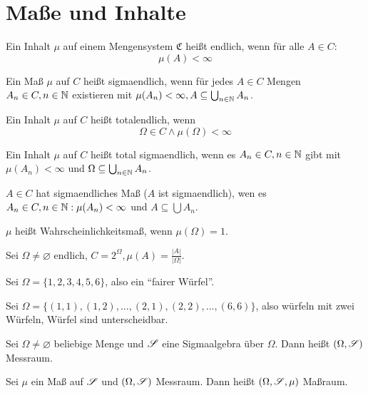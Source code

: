 	\section{Maße und Inhalte}
		\begin{defi}
			Ein Inhalt $\mu$ auf einem Mengensystem $\mathfrak{C}$ heißt endlich, wenn für alle $A\in C$:
			\[ \mu(A)<\infty \]
		\end{defi}
		\begin{defi}
			Ein Maß $\mu$ auf $C$ heißt sigmaendlich, wenn für jedes $A\in C$ Mengen $A_n\in C, n\in \mathbb{N}$ existieren mit $\mu(A_n)<\infty, A\subseteq \bigcup_{n\in\mathbb{N}} A_n$.
		\end{defi}
		\begin{defi}
			Ein Inhalt $\mu$ auf $C$ heißt totalendlich, wenn
			\[ \Omega\in C\land \mu(\Omega)<\infty \]
		\end{defi}
		\begin{defi}
			Ein Inhalt $\mu$ auf $C$ heißt total sigmaendlich, wenn es $A_n\in C, n\in \mathbb{N}$ gibt mit $\mu(A_n)<\infty$ und $\Omega\subseteq \bigcup_{n\in \mathbb{N}} A_n$. 
		\end{defi}
		\begin{defi}
			$A\in C$ hat sigmaendliches Maß ($A$ ist sigmaendlich), wen es $A_n\in C, n\in\mathbb{N}: \mu(A_n)<\infty$ und $A\subseteq \bigcup A_n$. 
		\end{defi}
		\begin{defi}
			$\mu$ heißt Wahrscheinlichkeitsmaß, wenn $\mu(\Omega)=1$.
		\end{defi}
		\begin{bsp}
			Sei $\Omega\neq\varnothing$ endlich, $C=2^\Omega, \mu(A)=\frac{|A|}{|\Omega|}$.
		\end{bsp}
		\begin{bsp}
			Sei $\Omega=\{1,2,3,4,5,6\}$, also ein "`fairer Würfel"'.
			\end{bsp}
		\begin{bsp}
			Sei $\Omega=\{(1,1), (1,2),...,(2,1),(2,2),...,(6,6)\}$, also würfeln mit zwei Würfeln, Würfel sind unterscheidbar. 
		\end{bsp}
		\begin{defi}
			Sei $\Omega\neq\varnothing$ beliebige Menge und $\mathscr{S}$ eine Sigmaalgebra über $\Omega$. Dann heißt $(\Omega, \mathscr{S})$ Messraum. 
		\end{defi}
		\begin{defi}
			Sei $\mu$ ein Maß auf $\mathscr{S}$ und $(\Omega, \mathscr{S})$ Messraum. Dann heißt $(\Omega, \mathscr{S}, \mu)$ Maßraum. 
		\end{defi}
